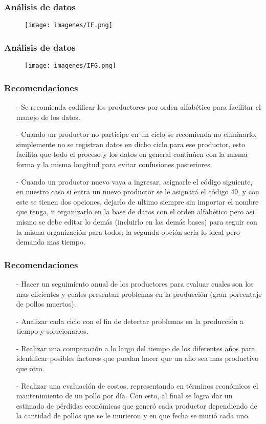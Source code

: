 \documentclass[11pt]{beamer}
\begin{document}
\begin{frame}
\frametitle{Análisis de datos}
\begin{figure}[!h]
        \texttt{[image: imagenes/IF.png]}
        \label{figura1}
\end{figure}
\end{frame}

\begin{frame}
\frametitle{Análisis de datos}
\begin{figure}[!h]
        \texttt{[image: imagenes/IFG.png]}
        \label{figura1}
\end{figure}
\end{frame}

\begin{frame}
\frametitle{Recomendaciones}
\begin{itemize}
\justifying
\item[-]Se recomienda codificar los productores por orden alfabético para facilitar el manejo de los datos.
\item[-]Cuando un productor no participe en un ciclo se recomienda no eliminarlo, simplemente no se registran datos en dicho ciclo para ese productor, esto facilita que todo el proceso y los datos en general continúen con la misma forma y la misma longitud para evitar confusiones posteriores.
\item[-]Cuando un productor nuevo vaya a ingresar, asignarle el código siguiente, en nuestro caso si entra un nuevo productor se le asignará el código 49, y con este se tienen dos opciones, dejarlo de ultimo siempre sin importar el nombre que tenga, u organizarlo en la base de datos con el orden alfabético pero así mismo se debe editar lo demás (incluirlo en las demás bases) para seguir con la misma organización para todos; la segunda opción sería lo ideal pero demanda mas tiempo.
\end{itemize}
\end{frame}

\begin{frame}
\frametitle{Recomendaciones}
\begin{itemize}
\justifying
\item[-]Hacer un seguimiento anual de los productores para evaluar cuales son los mas eficientes y cuales presentan problemas en la producción (gran porcentaje de pollos muertos).
\item[-]Analizar cada ciclo con el fin de detectar problemas en la producción a tiempo y solucionarlos.
\item[-]Realizar una comparación a lo largo del tiempo de los diferentes años para identificar posibles factores que puedan hacer que un año sea mas productivo que otro.
\item[-]Realizar una evaluación de costos, representando en términos económicos el mantenimiento de un pollo por día. Con esto, al final se logra dar un estimado de pérdidas económicas que generó cada productor dependiendo de la cantidad de pollos que se le murieron y en que fecha se murió cada uno.
\end{itemize}
\end{frame}
\end{document}
